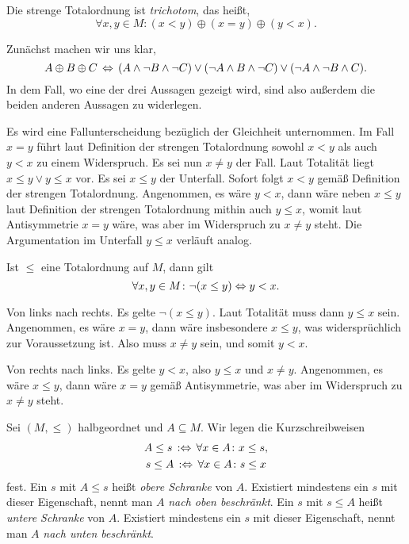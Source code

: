 \begin{Satz}
Die strenge Totalordnung ist \emph{trichotom},
das heißt,
\[\forall x,y\in M\colon (x<y) \oplus (x=y)\oplus (y<x).\]
\end{Satz}
\begin{Beweis}
Zunächst machen wir uns klar,
\[A\oplus B\oplus C\,\Leftrightarrow\, (A\land\lnot B\land\lnot C)\lor
(\lnot A\land B\land\lnot C)\lor (\lnot A\land \lnot B\land C).\]
In dem Fall, wo eine der drei Aussagen gezeigt wird, sind also
außerdem die beiden anderen Aussagen zu widerlegen.

Es wird eine Fallunterscheidung bezüglich der Gleichheit unternommen.
Im Fall $x=y$ führt laut Definition der strengen Totalordnung
sowohl $x<y$ als auch $y<x$ zu einem Widerspruch. Es sei nun $x\ne y$
der Fall. Laut Totalität liegt $x\le y\lor y\le x$ vor.
Es sei $x\le y$ der Unterfall. Sofort folgt $x<y$ gemäß Definition
der strengen Totalordnung. Angenommen, es wäre $y<x$, dann wäre neben
$x\le y$ laut Definition der strengen Totalordnung mithin auch $y\le x$,
womit laut Antisymmetrie $x=y$ wäre, was aber im Widerspruch zu $x\ne y$
steht. Die Argumentation im Unterfall $y\le x$ verläuft analog.\,\qedsymbol
\end{Beweis}

\begin{Satz}
Ist $\le$ eine Totalordnung auf $M$, dann gilt
\[\forall x,y\in M\colon \lnot (x \le y) \Leftrightarrow y < x.\]
\end{Satz}
\begin{Beweis}
Von links nach rechts. Es gelte $\lnot (x\le y)$. Laut Totalität muss
dann $y\le x$ sein. Angenommen, es wäre $x=y$, dann wäre insbesondere
$x\le y$, was widersprüchlich zur Voraussetzung ist. Also muss
$x\ne y$ sein, und somit $y<x$.

Von rechts nach links. Es gelte $y<x$, also $y\le x$ und $x\ne y$.
Angenommen, es wäre $x\le y$, dann wäre $x=y$ gemäß Antisymmetrie, was
aber im Widerspruch zu $x\ne y$ steht.\,\qedsymbol
\end{Beweis}

\noindent
Sei $(M,\le)$ halbgeordnet und $A\subseteq M$. Wir legen die
Kurzschreibweisen
\begin{gather*}
A\le s\, :\Leftrightarrow\, \forall x\in A\colon x\le s,\\
s\le A\, :\Leftrightarrow\, \forall x\in A\colon s\le x
\end{gather*}
fest. Ein $s$ mit $A\le s$ heißt \emph{obere Schranke} von $A$. Existiert
mindestens ein $s$ mit dieser Eigenschaft, nennt man $A$ \emph{nach oben
beschränkt}. Ein $s$ mit $s\le A$ heißt \emph{untere Schranke} von $A$.
Existiert mindestens ein $s$ mit dieser Eigenschaft, nennt man $A$
\emph{nach unten beschränkt}.

